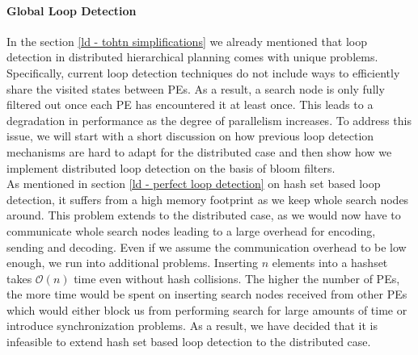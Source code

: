 \paragraph{Global Loop Detection}
\label{ld - global}
In the section \ref{ld - tohtn simplifications} we already mentioned that loop detection in distributed hierarchical planning comes with unique problems. Specifically, current loop detection techniques do not include ways to efficiently share the visited states between PEs. As a result, a search node is only fully filtered out once each PE has encountered it at least once. This leads to a degradation in performance as the degree of parallelism increases. To address this issue, we will start with a short discussion on how previous loop detection mechanisms are hard to adapt for the distributed case and then show how we implement distributed loop detection on the basis of bloom filters. \\
As mentioned in section \ref{ld - perfect loop detection} on hash set based loop detection, it suffers from a high memory footprint as we keep whole search nodes around. This problem extends to the distributed case, as we would now have to communicate whole search nodes leading to a large overhead for encoding, sending and decoding. Even if we assume the communication overhead to be low enough, we run into additional problems. Inserting $n$ elements into a hashset takes $\mathcal{O}(n)$ time even without hash collisions. The higher the number of PEs, the more time would be spent on inserting search nodes received from other PEs which would either block us from performing search for large amounts of time or introduce synchronization problems. As a result, we have decided that it is infeasible to extend hash set based loop detection to the distributed case. \\
\begin{comment}
- insertion of $n$ search nodes is expensive
- encoding and decoding becomes more difficult, especially


- previous section \ref{ld - tohtn simplifications} mentions that distributed planning makes loop detection less efficient
- recursion is still fine
- different paths leading to equivalent nodes are no longer detected

- normal loop detection gets worse in distributed (TO)HTN planning
- each worker tracks it's own set of known nodes
- if worker $w_1$ encounters a node, workers $w_2, \ldots, w_n$ will not filter that node out until they've encountered it themselves at least once

- we try to find a way to perform global loop detection
\end{comment}
